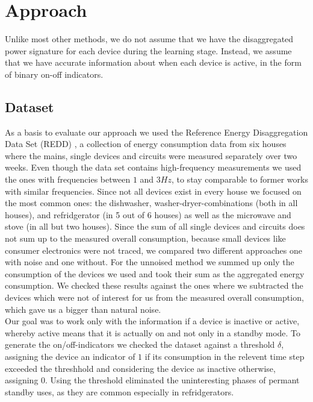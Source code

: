 \documentclass{article}
\begin{document}
\section{Approach}


Unlike most other methods, we do not assume that we have the disaggregated power signature for each device during the learning stage.
Instead, we assume that we have accurate information about when each device is active, in the form of binary on-off indicators.

\subsection{Dataset}
As a basis to evaluate our approach we used the Reference Energy Disaggregation Data Set (REDD) \cite{Redd}, a collection of energy consumption data 
from six houses where the mains, single devices and circuits were measured separately over two weeks. Even though the data set contains high-frequency 
measurements we used the ones with frequencies between $1$ and $3 Hz$, to stay comparable to former works with similar frequencies. Since not all 
devices exist in every house we focused on the most common ones: the dishwasher, washer-dryer-combinations (both in all houses), and refridgerator (in 5 
out of 6 houses) as well as the microwave and stove (in all but two houses). Since the sum of all single devices and circuits does not sum up to the 
measured overall consumption, because small devices like consumer electronics were not traced, we compared two different approaches one with noise 
and one without. For the unnoised method we summed up only the consumption of the devices we used and took their sum as the aggregated energy consumption. 
We checked these results against the ones where we subtracted the devices which were not of interest for us from the measured overall consumption, which 
gave us a bigger than natural noise.\\
Our goal was to work only with the information if a device is inactive or active, whereby active means that it is actually on and not only in a
standby mode. To generate the  on/off-indicators we checked the dataset against a threshold $\delta$, assigning the device an indicator of $1$ if its 
consumption in the relevent time step exceeded the threshhold and considering the device as inactive otherwise, assigning $0$. Using the threshold 
eliminated the uninteresting phases of permant standby uses, as they are common especially in refridgerators.
\end{document}
